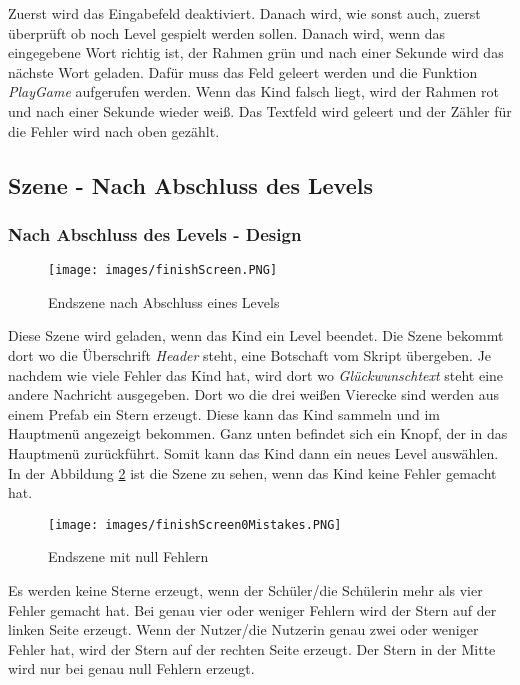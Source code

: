 Zuerst wird das Eingabefeld deaktiviert. Danach wird, wie sonst auch, zuerst überprüft ob noch Level gespielt werden sollen. Danach wird, wenn das eingegebene Wort richtig ist, der Rahmen grün und nach einer Sekunde wird das nächste Wort geladen. Dafür muss das Feld geleert werden und die Funktion \textit{PlayGame} aufgerufen werden. Wenn das Kind falsch liegt, wird der Rahmen rot und nach einer Sekunde wieder weiß. Das Textfeld wird geleert und der Zähler für die Fehler wird nach oben gezählt.
\subsection{Szene - Nach Abschluss des Levels}
\subsubsection{Nach Abschluss des Levels - Design}
\begin{figure}[htbp]
  \centering
  \texttt{[image: images/finishScreen.PNG]}
  \caption{Endszene nach Abschluss eines Levels}
  \label{finishSzene}
\end{figure}
Diese Szene wird geladen, wenn das Kind ein Level beendet. Die Szene bekommt dort wo die Überschrift \textit{Header} steht, eine Botschaft vom Skript übergeben. Je nachdem wie viele Fehler das Kind hat, wird dort wo \textit{Glückwunschtext} steht eine andere Nachricht ausgegeben. Dort wo die drei weißen Vierecke sind werden aus einem Prefab ein Stern erzeugt. Diese kann das Kind sammeln und im Hauptmenü angezeigt bekommen. Ganz unten befindet sich ein Knopf, der in das Hauptmenü zurückführt. Somit kann das Kind dann ein neues Level auswählen. In der Abbildung \ref{withoutError} ist die Szene zu sehen, wenn das Kind keine Fehler gemacht hat.
\begin{figure}[htbp]
  \centering
  \texttt{[image: images/finishScreen0Mistakes.PNG]}
  \caption{Endszene mit null Fehlern}
  \label{withoutError}
\end{figure}
Es werden keine Sterne erzeugt, wenn der Schüler/die Schülerin mehr als vier Fehler gemacht hat. Bei genau vier oder weniger Fehlern wird der Stern auf der linken Seite erzeugt. Wenn der Nutzer/die Nutzerin genau zwei oder weniger Fehler hat, wird der Stern auf der rechten Seite erzeugt. Der Stern in der Mitte wird nur bei genau null Fehlern erzeugt.
